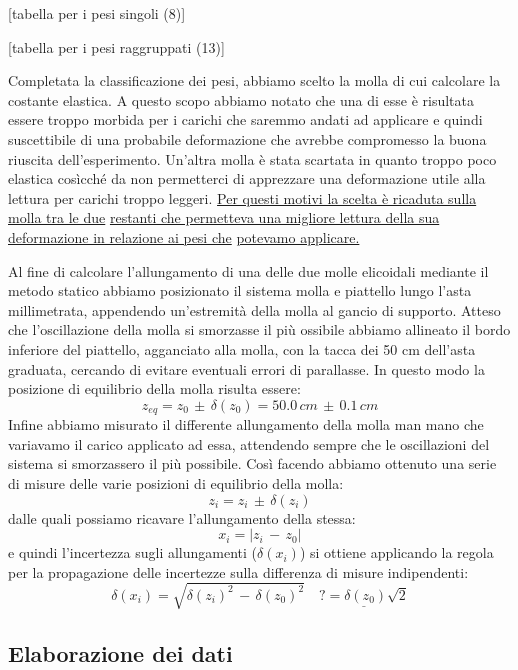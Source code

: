 [tabella per i pesi singoli (8)]

[tabella per i pesi raggruppati (13)]

Completata la classificazione dei pesi, abbiamo scelto la molla di cui calcolare la
costante elastica. A questo scopo abbiamo notato che una di esse è risultata essere troppo
morbida per i carichi che saremmo andati ad applicare e quindi suscettibile di una
probabile deformazione che avrebbe compromesso la buona riuscita dell'esperimento.
Un'altra molla è stata scartata in quanto troppo poco elastica cosìcché da non permetterci
di apprezzare una deformazione utile alla lettura per carichi troppo leggeri. \underline{Per questi motivi la scelta è ricaduta sulla molla tra le due}
\underline{restanti che permetteva una migliore lettura della sua deformazione in relazione ai pesi che} \break
\underline{potevamo applicare.}

Al fine di calcolare l'allungamento di una delle due molle elicoidali mediante il metodo statico abbiamo posizionato il sistema molla e piattello lungo l'asta millimetrata, appendendo un'estremità della molla al gancio di supporto. Atteso che l'oscillazione della molla si smorzasse il più ossibile abbiamo allineato il bordo inferiore del piattello, agganciato alla molla, con la tacca dei 50 cm dell'asta graduata, cercando di evitare eventuali errori di parallasse. In questo modo la posizione di equilibrio della molla risulta essere:
\begin{equation}
	z_{eq} = z_0\,\pm\,\delta(z_0) = 50.0\,cm\,\pm\,0.1\,cm
\end{equation}
Infine abbiamo misurato il differente allungamento della molla man mano che variavamo il carico applicato ad essa, attendendo sempre che le oscillazioni del sistema si smorzassero il più possibile. Così facendo abbiamo ottenuto una serie di misure delle varie posizioni di equilibrio della molla:
\begin{equation}
	z_i = z_i\,\pm\,\delta(z_i) 
\end{equation}
dalle quali possiamo ricavare l'allungamento della stessa:
\begin{equation}
	x_i = |z_i\,-\,z_0|
\end{equation}
e quindi l’incertezza sugli allungamenti ($\delta(x_i)$) si ottiene applicando la regola per la propagazione delle incertezze sulla differenza di misure indipendenti:
\begin{equation}
	\delta(x_i) = \sqrt{\delta(z_i)^2\,-\,\delta(z_0)^2}
	\quad \underline{? = \delta(z_0)\sqrt{2}}
\end{equation}

\subsection{Elaborazione dei dati}
